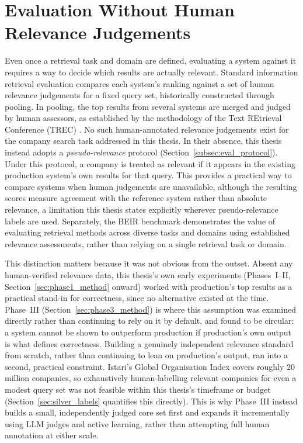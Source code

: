 \documentclass[a4paper,oneside,bibliography=totoc]{scrbook}
\begin{document}
\section{Evaluation Without Human Relevance Judgements}
\label{sec:lit_evaluation}

Even once a retrieval task and domain are defined, evaluating a system against it requires a way to decide which results are actually relevant. Standard information retrieval evaluation compares each system's ranking against a set of human relevance judgements for a fixed query set, historically constructed through pooling. In pooling, the top results from several systems are merged and judged by human assessors, as established by the methodology of the Text REtrieval Conference (TREC) \citep{voorhees2002philosophy}. No such human-annotated relevance judgements exist for the company search task addressed in this thesis. In their absence, this thesis instead adopts a \emph{pseudo-relevance} protocol (Section~\ref{subsec:eval_protocol}). Under this protocol, a company is treated as relevant if it appears in the existing production system's own results for that query. This provides a practical way to compare systems when human judgements are unavailable, although the resulting scores measure agreement with the reference system rather than absolute relevance, a limitation this thesis states explicitly wherever pseudo-relevance labels are used. Separately, the BEIR benchmark \citep{thakur2021beir} demonstrates the value of evaluating retrieval methods across diverse tasks and domains using established relevance assessments, rather than relying on a single retrieval task or domain.

This distinction matters because it was not obvious from the outset. Absent any human-verified relevance data, this thesis's own early experiments (Phases~I--II, Section~\ref{sec:phase1_method} onward) worked with production's top results as a practical stand-in for correctness, since no alternative existed at the time. Phase~III (Section~\ref{sec:phase3_method}) is where this assumption was examined directly rather than continuing to rely on it by default, and found to be circular: a system cannot be shown to outperform production if production's own output is what defines correctness. Building a genuinely independent relevance standard from scratch, rather than continuing to lean on production's output, ran into a second, practical constraint. Istari's Global Organisation Index covers roughly 20 million companies, so exhaustively human-labelling relevant companies for even a modest query set was not feasible within this thesis's timeframe or budget (Section~\ref{sec:silver_labels} quantifies this directly). This is why Phase~III instead builds a small, independently judged core set first and expands it incrementally using LLM judges and active learning, rather than attempting full human annotation at either scale.
\end{document}
